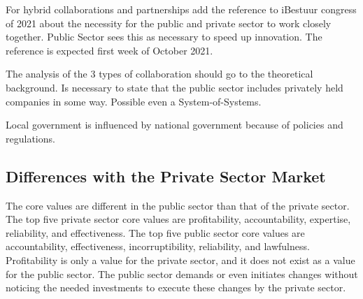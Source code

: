 \begin{remark}
	For hybrid collaborations and partnerships add the reference to iBestuur congress of 2021 about the necessity for the public and private sector to work closely together. Public Sector sees this as necessary to speed up innovation. The reference is expected first week of October 2021.
\end{remark}

\begin{remark}
	The analysis of the 3 types of collaboration should go to the theoretical background. Is necessary to state that the public sector includes privately held companies in some way. Possible even a System-of-Systems.
\end{remark}

\begin{remark}
	Local government is influenced by national government because of policies and regulations.
\end{remark}
\subsection{Differences with the Private Sector Market}
\label{sub:tbdifferenceprivatesector}

The core values are different in the public sector than that of the private sector. The top five private sector core values are profitability, accountability, expertise, reliability, and effectiveness. The top five public sector core values are accountability, effectiveness, incorruptibility, reliability, and lawfulness. \parencite{Wal2008} Profitability is only a value for the private sector, and it does not exist as a value for the public sector.  The public sector demands or even initiates changes without noticing the needed investments to execute these changes by the private sector.
